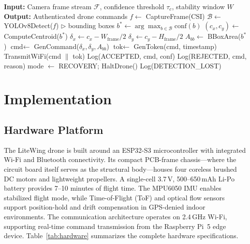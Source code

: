 \documentclass[conference]{IEEEtran}
\begin{document}
\begin{algorithm}[!t]
\caption{SecureDrone Tracking Control Loop}
\label{alg:tracking}
\begin{algorithmic}[1]
\STATE \textbf{Input:} Camera frame stream $\mathcal{F}$, confidence threshold $\tau_c$, stability window $W$
\STATE \textbf{Output:} Authenticated drone commands
    \STATE $f \leftarrow$ CaptureFrame(CSI)
    \STATE $\mathcal{B} \leftarrow$ YOLOv8Detect($f$) \hfill $\triangleright$ bounding boxes
        \STATE $b^* \leftarrow \arg\max_{b \in \mathcal{B}} \text{conf}(b)$
        \STATE $(c_x, c_y) \leftarrow$ ComputeCentroid($b^*$)
        \STATE $\delta_x \leftarrow c_x - W_{\text{frame}}/2$
        \STATE $\delta_y \leftarrow c_y - H_{\text{frame}}/2$
        \STATE $A_{bb} \leftarrow$ BBoxArea($b^*$)
        \STATE $\text{cmd} \leftarrow$ GenCommand($\delta_x, \delta_y, A_{bb}$)
        \STATE $\text{tok} \leftarrow$ GenToken(cmd, timestamp)
            \STATE TransmitWiFi(cmd $\|$ tok)
            \STATE Log(ACCEPTED, cmd, conf)
        \ELSE
            \STATE Log(REJECTED, cmd, reason)
        \ENDIF
    \ELSE
        \STATE mode $\leftarrow$ RECOVERY; HaltDrone()
        \STATE Log(DETECTION\_LOST)
    \ENDIF
\ENDWHILE
\end{algorithmic}
\end{algorithm}

\section{Implementation}
\label{sec:implementation}

\subsection{Hardware Platform}

The LiteWing drone is built around an ESP32-S3 microcontroller with integrated Wi-Fi and Bluetooth connectivity. Its compact PCB-frame chassis---where the circuit board itself serves as the structural body---houses four coreless brushed DC motors and lightweight propellers. A single-cell 3.7\,V, 500--650\,mAh Li-Po battery provides 7--10 minutes of flight time. The MPU6050 IMU enables stabilized flight mode, while Time-of-Flight (ToF) and optical flow sensors support position-hold and drift compensation in GPS-denied indoor environments. The communication architecture operates on 2.4\,GHz Wi-Fi, supporting real-time command transmission from the Raspberry Pi~5 edge device. Table~\ref{tab:hardware} summarizes the complete hardware specifications.
\end{document}
